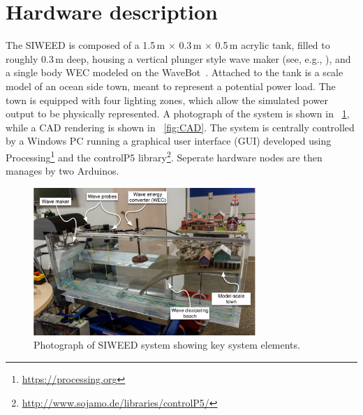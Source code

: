 \documentclass[11pt, letterpaper]{article}
\begin{document}
\section{Hardware description} %
The SIWEED is composed of a 1.5\,m $\times{}$ 0.3\,m $\times{}$ 0.5\,m acrylic tank, filled to roughly 0.3\,m deep, housing a vertical plunger style wave maker (see, e.g., \cite{hyun1976simplified}), and a single body WEC modeled on the WaveBot~\cite{Coe2016a}.
Attached to the tank is a scale model of an ocean side town, meant to represent a potential power load.
The town is equipped with four lighting zones, which allow the simulated power output to be physically represented.
A photograph of the system is shown in \figurename~\ref{fig:siweed_photo_with_callouts}, while a CAD rendering is shown in \figurename~\ref{fig:CAD}.
The system is centrally controlled by a Windows PC running a graphical user interface (GUI) developed using Processing\footnote{\url{https://processing.org}} and the controlP5 library\footnote{\url{http://www.sojamo.de/libraries/controlP5/}}.
Seperate hardware nodes are then manages by two Arduinos.

\begin{figure}[tb]
  \centering
  \includegraphics[width=0.75\textwidth]{diagrams/siweed_photo_with_callouts.pdf}
  \caption{Photograph of SIWEED system showing key system elements.}
  \label{fig:siweed_photo_with_callouts}
\end{figure}
\end{document}
